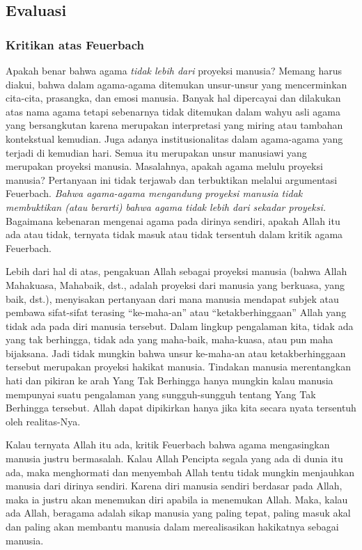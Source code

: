 \documentclass[11pt,twoside,a5paper,openany]{memoir}
\begin{document}
\hypertarget{evaluasi}{%
\subsection{Evaluasi}\label{evaluasi}}

\hypertarget{kritikan-atas-feuerbach}{%
\subsubsection{Kritikan atas Feuerbach}\label{kritikan-atas-feuerbach}}

Apakah benar bahwa agama \emph{tidak lebih dari} proyeksi manusia?
Memang harus diakui, bahwa dalam agama-agama ditemukan unsur-unsur yang
mencerminkan cita-cita, prasangka, dan emosi manusia. Banyak hal
dipercayai dan dilakukan atas nama agama tetapi sebenarnya tidak
ditemukan dalam wahyu asli agama yang bersangkutan karena merupakan
interpretasi yang miring atau tambahan kontekstual kemudian. Juga adanya
institusionalitas dalam agama-agama yang terjadi di kemudian hari. Semua
itu merupakan unsur manusiawi yang merupakan proyeksi manusia.
Masalahnya, apakah agama melulu proyeksi manusia? Pertanyaan ini tidak
terjawab dan terbuktikan melalui argumentasi Feuerbach. \emph{Bahwa
agama-agama mengandung proyeksi manusia tidak membuktikan (atau berarti)
bahwa agama tidak lebih dari sekadar proyeksi.} Bagaimana kebenaran
mengenai agama pada dirinya sendiri, apakah Allah itu ada atau tidak,
ternyata tidak masuk atau tidak tersentuh dalam kritik agama Feuerbach.

Lebih dari hal di atas, pengakuan Allah sebagai proyeksi manusia (bahwa
Allah Mahakuasa, Mahabaik, dst., adalah proyeksi dari manusia yang
berkuasa, yang baik, dst.), menyisakan pertanyaan dari mana manusia
mendapat subjek atau pembawa sifat-sifat terasing ``ke-maha-an'' atau
``ketakberhinggaan'' Allah yang tidak ada pada diri manusia tersebut.
Dalam lingkup pengalaman kita, tidak ada yang tak berhingga, tidak ada
yang maha-baik, maha-kuasa, atau pun maha bijaksana. Jadi tidak mungkin
bahwa unsur ke-maha-an atau ketakberhinggaan tersebut merupakan proyeksi
hakikat manusia. Tindakan manusia merentangkan hati dan pikiran ke arah
Yang Tak Berhingga hanya mungkin kalau manusia mempunyai suatu
pengalaman yang sungguh-sungguh tentang Yang Tak Berhingga tersebut.
Allah dapat dipikirkan hanya jika kita secara nyata tersentuh oleh
realitas-Nya.

Kalau ternyata Allah itu ada, kritik Feuerbach bahwa agama mengasingkan
manusia justru bermasalah. Kalau Allah Pencipta segala yang ada di dunia
itu ada, maka menghormati dan menyembah Allah tentu tidak mungkin
menjauhkan manusia dari dirinya sendiri. Karena diri manusia sendiri
berdasar pada Allah, maka ia justru akan menemukan diri apabila ia
menemukan Allah. Maka, kalau ada Allah, beragama adalah sikap manusia
yang paling tepat, paling masuk akal dan paling akan membantu manusia
dalam merealisasikan hakikatnya sebagai manusia.
\end{document}
